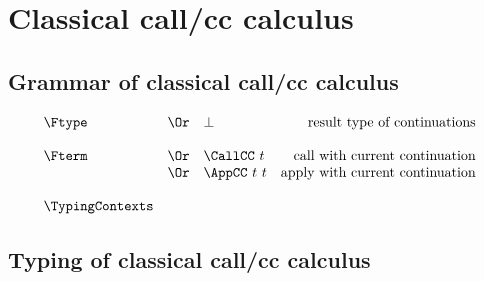 \documentclass{amsart}
\begin{document}
\UniversalIntroduction

\ExistentialIntroduction

\section{Classical call/cc calculus}

\subsection{Grammar of classical call/cc calculus}

\nc{}

\[
\begin{array}{lclr}
\Ftype
&\Or& \bot & \mbox{result type of continuations} \\
\\
\Fterm
&\Or& \CallCC~t & \mbox{call with current continuation} \\
&\Or& \AppCC~t~t & \mbox{apply with current continuation} \\
\\
\TypingContexts
\end{array}
\]

\subsection{Typing of classical call/cc calculus}
~

\nc{}

\nc{}

\nc{}

\nc{}
\end{document}
